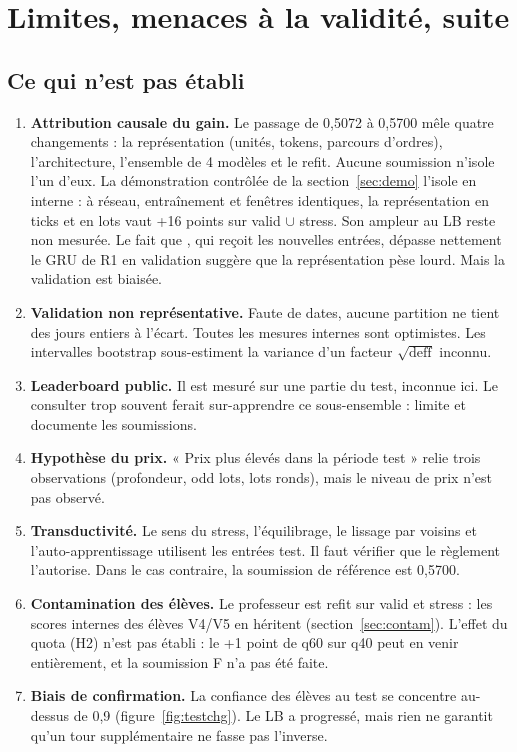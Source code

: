 \section{Limites, menaces à la validité, suite}\label{sec:limites}

\subsection{Ce qui n'est pas établi}
\begin{enumerate}
\item \textbf{Attribution causale du gain.} Le passage de 0,5072 à 0,5700 mêle quatre changements : la représentation (unités, tokens, parcours d'ordres), l'architecture, l'ensemble de 4 modèles et le refit. Aucune soumission n'isole l'un d'eux. La démonstration contrôlée de la section~\ref{sec:demo} l'isole en interne : à réseau, entraînement et fenêtres identiques, la représentation en ticks et en lots vaut +16 points sur valid $\cup$ stress. Son ampleur au LB reste non mesurée. Le fait que , qui reçoit les nouvelles entrées, dépasse nettement le GRU de R1 en validation suggère que la représentation pèse lourd. Mais la validation est biaisée.
\item \textbf{Validation non représentative.} Faute de dates, aucune partition ne tient des jours entiers à l'écart. Toutes les mesures internes sont optimistes. Les intervalles bootstrap sous-estiment la variance d'un facteur $\sqrt{\mathrm{deff}}$ inconnu.
\item \textbf{Leaderboard public.} Il est mesuré sur une partie du test, inconnue ici. Le consulter trop souvent ferait sur-apprendre ce sous-ensemble :  limite et documente les soumissions.
\item \textbf{Hypothèse du prix.} « Prix plus élevés dans la période test » relie trois observations (profondeur, odd lots, lots ronds), mais le niveau de prix n'est pas observé.
\item \textbf{Transductivité.} Le sens du stress, l'équilibrage, le lissage par voisins et l'auto-apprentissage utilisent les entrées test. Il faut vérifier que le règlement l'autorise. Dans le cas contraire, la soumission de référence est 0,5700.
\item \textbf{Contamination des élèves.} Le professeur est refit sur valid et stress : les scores internes des élèves V4/V5 en héritent (section~\ref{sec:contam}). L'effet du quota (H2) n'est pas établi : le +1 point de q60 sur q40 peut en venir entièrement, et la soumission F n'a pas été faite.
\item \textbf{Biais de confirmation.} La confiance des élèves au test se concentre au-dessus de 0,9 (figure~\ref{fig:testchg}). Le LB a progressé, mais rien ne garantit qu'un tour supplémentaire ne fasse pas l'inverse.
\end{enumerate}

